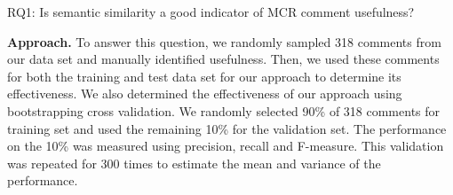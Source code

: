 %
%
%
%
%
%
%

\begin{ResearchQuestions}
\item[RQ1:] Is semantic similarity a good indicator of MCR comment usefulness?
\end{ResearchQuestions}

\textbf{Approach.} To answer this question, we randomly sampled 318 comments from our data set and manually identified usefulness.
Then, we used these comments for both the training and test data set for our approach to determine its effectiveness.
We also determined the effectiveness of our approach using bootstrapping cross validation.
We randomly selected 90\% of 318 comments for training set and used the remaining 10\% for the validation set.
The performance on the 10\% was measured using precision, recall and F-measure.
This validation was repeated for 300 times to estimate the mean and variance of the performance.

